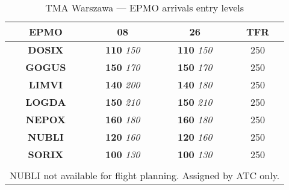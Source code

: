 \begin{table}[htbp]
  \centering
  \begin{tabular}{|c|c|c|c|}
    \rowcolor{white}
    \hline
    \cellcolor{vred}\color{white}\textbf{EPMO}&\textbf{08}&\textbf{26}&\textbf{TFR}\\\hline
    \textbf{DOSIX} & \textbf{110} \textit{150} & \textbf{110} \textit{150} & 250\\\hline
    \textbf{GOGUS} & \textbf{150} \textit{170} & \textbf{150} \textit{170} & 250\\\hline
    \textbf{LIMVI} & \textbf{140} \textit{200} & \textbf{140} \textit{180} & 250\\\hline
    \textbf{LOGDA} & \textbf{150} \textit{210} & \textbf{150} \textit{210} & 250\\\hline
    \textbf{NEPOX} & \textbf{160} \textit{180} & \textbf{160} \textit{180} & 250\\\hline
    \textbf{NUBLI} & \textbf{120} \textit{160} & \textbf{120} \textit{160} & 250\\\hline
    \textbf{SORIX} & \textbf{100} \textit{130} & \textbf{100} \textit{130} & 250\\\hline
    \multicolumn{4}{|c|}{}\\\hline
    \multicolumn{4}{|c|}{NUBLI not available for flight planning. Assigned by ATC only.}\\\hline
  \end{tabular}
  \caption{TMA Warszawa --- EPMO arrivals entry levels}
  \label{tab:acc:coordination:warszawa:epmo:entry}
\end{table}
